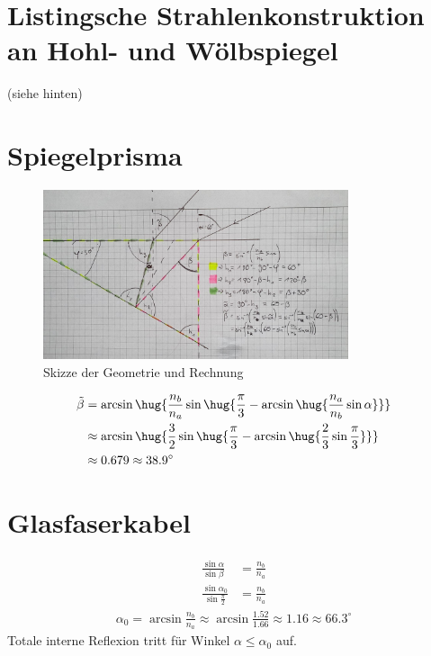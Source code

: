 \documentclass[ex]{exercise}
\begin{document}
\section{Listingsche Strahlenkonstruktion an Hohl- und Wölbspiegel}
\hfill(siehe hinten)\hspace*{\fill}
\vspace{-0.3cm}

\section{Spiegelprisma}
\begin{figure}[h]
    \centering
    \includegraphics[width=0.8\textwidth]{1.jpg}
    \caption{Skizze der Geometrie und Rechnung}
\end{figure}
\vspace{-0.5cm}
\begin{align*}
    \tilde \beta &= \arcsin\hug{\frac{n_b}{n_a} \sin\hug{\frac{\pi}{3}-\arcsin\hug{\frac{n_a}{n_b} \sin \alpha}}}\\
    &\approx \arcsin\hug{\frac32 \sin\hug{\frac{\pi}{3}-\arcsin\hug{\frac23 \sin \frac{\pi}{3}}}}\\
    &\approx 0.679 \approx 38.9^\circ
\end{align*}

\section{Glasfaserkabel}
\begin{align*}
    \frac{\sin\alpha}{\sin\beta} &= \frac{n_b}{n_a}\\
    \frac{\sin\alpha_{0}}{\sin\frac\pi2} &= \frac{n_b}{n_a}
\end{align*}\vspace{-0.6cm}
\begin{align*}
    \alpha_{0} = \arcsin\frac{n_b}{n_a}
    \approx \arcsin\frac{1.52}{1.66}
    \approx 1.16 \approx 66.3^\circ 
\end{align*}
Totale interne Reflexion tritt für Winkel \(\alpha\le\alpha_0\) auf.\\
\end{document}
